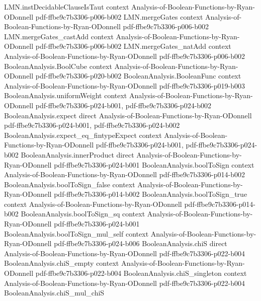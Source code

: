 \begin{lemma}
\proofstep
  {LMN.instDecidableClauseIsTaut}
  {context}
  {Analysis-of-Boolean-Functions-by-Ryan-ODonnell}
  {pdf-ffbe9c7b3306-p006-b002}
\proofstep
  {LMN.mergeGates}
  {context}
  {Analysis-of-Boolean-Functions-by-Ryan-ODonnell}
  {pdf-ffbe9c7b3306-p006-b002}
\proofstep
  {LMN.mergeGates_castAdd}
  {context}
  {Analysis-of-Boolean-Functions-by-Ryan-ODonnell}
  {pdf-ffbe9c7b3306-p006-b002}
\proofstep
  {LMN.mergeGates_natAdd}
  {context}
  {Analysis-of-Boolean-Functions-by-Ryan-ODonnell}
  {pdf-ffbe9c7b3306-p006-b002}
\proofstep
  {BooleanAnalysis.BoolCube}
  {context}
  {Analysis-of-Boolean-Functions-by-Ryan-ODonnell}
  {pdf-ffbe9c7b3306-p020-b002}
\proofstep
  {BooleanAnalysis.BooleanFunc}
  {context}
  {Analysis-of-Boolean-Functions-by-Ryan-ODonnell}
  {pdf-ffbe9c7b3306-p019-b003}
\proofstep
  {BooleanAnalysis.uniformWeight}
  {context}
  {Analysis-of-Boolean-Functions-by-Ryan-ODonnell}
  {pdf-ffbe9c7b3306-p024-b001,
    pdf-ffbe9c7b3306-p024-b002}
\proofstep
  {BooleanAnalysis.expect}
  {direct}
  {Analysis-of-Boolean-Functions-by-Ryan-ODonnell}
  {pdf-ffbe9c7b3306-p024-b001,
    pdf-ffbe9c7b3306-p024-b002}
\proofstep
  {BooleanAnalysis.expect_eq_fintypeExpect}
  {context}
  {Analysis-of-Boolean-Functions-by-Ryan-ODonnell}
  {pdf-ffbe9c7b3306-p024-b001,
    pdf-ffbe9c7b3306-p024-b002}
\proofstep
  {BooleanAnalysis.innerProduct}
  {direct}
  {Analysis-of-Boolean-Functions-by-Ryan-ODonnell}
  {pdf-ffbe9c7b3306-p024-b001}
\proofstep
  {BooleanAnalysis.boolToSign}
  {context}
  {Analysis-of-Boolean-Functions-by-Ryan-ODonnell}
  {pdf-ffbe9c7b3306-p014-b002}
\proofstep
  {BooleanAnalysis.boolToSign_false}
  {context}
  {Analysis-of-Boolean-Functions-by-Ryan-ODonnell}
  {pdf-ffbe9c7b3306-p014-b002}
\proofstep
  {BooleanAnalysis.boolToSign_true}
  {context}
  {Analysis-of-Boolean-Functions-by-Ryan-ODonnell}
  {pdf-ffbe9c7b3306-p014-b002}
\proofstep
  {BooleanAnalysis.boolToSign_sq}
  {context}
  {Analysis-of-Boolean-Functions-by-Ryan-ODonnell}
  {pdf-ffbe9c7b3306-p024-b001}
\proofstep
  {BooleanAnalysis.boolToSign_mul_self}
  {context}
  {Analysis-of-Boolean-Functions-by-Ryan-ODonnell}
  {pdf-ffbe9c7b3306-p024-b006}
\proofstep
  {BooleanAnalysis.chiS}
  {direct}
  {Analysis-of-Boolean-Functions-by-Ryan-ODonnell}
  {pdf-ffbe9c7b3306-p022-b004}
\proofstep
  {BooleanAnalysis.chiS_empty}
  {context}
  {Analysis-of-Boolean-Functions-by-Ryan-ODonnell}
  {pdf-ffbe9c7b3306-p022-b004}
\proofstep
  {BooleanAnalysis.chiS_singleton}
  {context}
  {Analysis-of-Boolean-Functions-by-Ryan-ODonnell}
  {pdf-ffbe9c7b3306-p022-b004}
\proofstep
  {BooleanAnalysis.chiS_mul_chiS}

\end{lemma}
